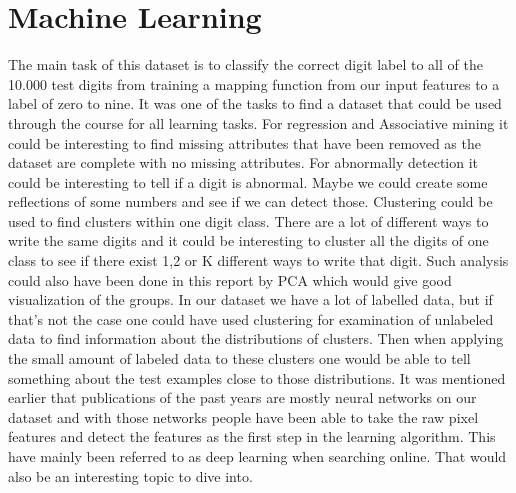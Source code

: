 \section{Machine Learning}


The main task of this dataset is to classify the correct digit label to all of the 10.000 test digits from training a mapping function from our input features to a label of zero to nine. It was one of the tasks to find a dataset that could be used through the course for all learning tasks.
For regression and Associative mining it could be interesting to find missing attributes that have been removed as the dataset are complete with no missing attributes. For abnormally detection it could be interesting to tell if a digit is abnormal. Maybe we could create some reflections of some numbers and see if we can detect those. 
Clustering could be used to find clusters within one digit class. There are a lot of different ways to write the same digits and it could be interesting to cluster all the digits of one class to see if there exist 1,2 or K different ways to write that digit. Such analysis could also have been done in this report by PCA which would give good visualization of the groups.
In our dataset we have a lot of labelled data, but if that’s not the case one could have used clustering for examination of unlabeled data to find information about the distributions of clusters. Then when applying the small amount of labeled data to these clusters one would be able to tell something about the test examples close to those distributions.
It was mentioned earlier that publications of the past years are mostly neural networks on our dataset and with those networks people have been able to take the raw pixel features and detect the features as the first step in the learning algorithm. This have mainly been referred to as deep learning when searching online. That would also be an interesting topic to dive into.
